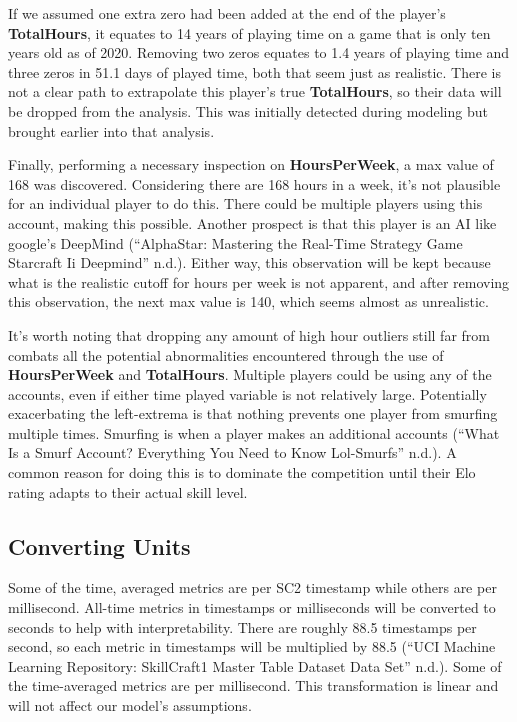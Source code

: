 \documentclass[]{article}
\begin{document}
If we assumed one extra zero had been added at the end of the player's
\textbf{TotalHours}, it equates to 14 years of playing time on a game
that is only ten years old as of 2020. Removing two zeros equates to 1.4
years of playing time and three zeros in 51.1 days of played time, both
that seem just as realistic. There is not a clear path to extrapolate
this player's true \textbf{TotalHours}, so their data will be dropped
from the analysis. This was initially detected during modeling but
brought earlier into that analysis.

Finally, performing a necessary inspection on \textbf{HoursPerWeek}, a
max value of 168 was discovered. Considering there are 168 hours in a
week, it's not plausible for an individual player to do this. There
could be multiple players using this account, making this possible.
Another prospect is that this player is an AI like google's DeepMind
(``AlphaStar: Mastering the Real-Time Strategy Game Starcraft Ii
\textbar{} Deepmind'' n.d.). Either way, this observation will be kept
because what is the realistic cutoff for hours per week is not apparent,
and after removing this observation, the next max value is 140, which
seems almost as unrealistic.

It's worth noting that dropping any amount of high hour outliers still
far from combats all the potential abnormalities encountered through the
use of \textbf{HoursPerWeek} and \textbf{TotalHours}. Multiple players
could be using any of the accounts, even if either time played variable
is not relatively large. Potentially exacerbating the left-extrema is
that nothing prevents one player from smurfing multiple times. Smurfing
is when a player makes an additional accounts (``What Is a Smurf
Account? Everything You Need to Know \textbar{} Lol-Smurfs'' n.d.). A
common reason for doing this is to dominate the competition until their
Elo rating adapts to their actual skill level.

\hypertarget{converting-units}{%
\subsection{Converting Units}\label{converting-units}}

Some of the time, averaged metrics are per SC2 timestamp while others
are per millisecond. All-time metrics in timestamps or milliseconds will
be converted to seconds to help with interpretability. There are roughly
88.5 timestamps per second, so each metric in timestamps will be
multiplied by 88.5 (``UCI Machine Learning Repository: SkillCraft1
Master Table Dataset Data Set'' n.d.). Some of the time-averaged metrics
are per millisecond. This transformation is linear and will not affect
our model's assumptions.
\end{document}
